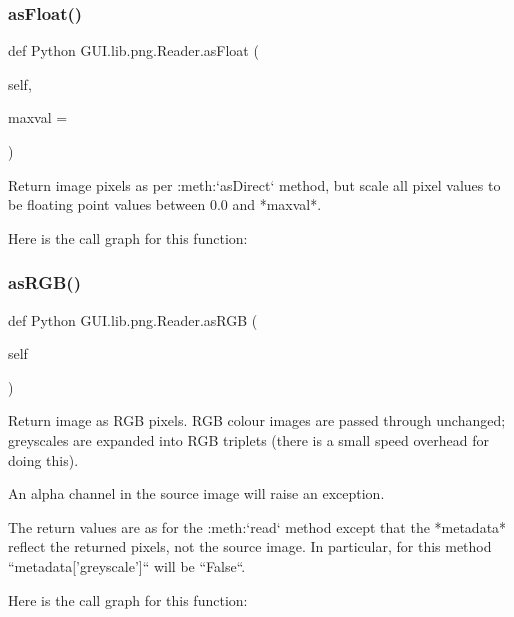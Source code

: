 \subsubsection{\texorpdfstring{as\+Float()}{asFloat()}}
{\footnotesize\ttfamily def Python G\+U\+I.\+lib.\+png.\+Reader.\+as\+Float (\begin{DoxyParamCaption}\item[{}]{self,  }\item[{}]{maxval = {} }\end{DoxyParamCaption})}

\begin{DoxyVerb}Return image pixels as per :meth:`asDirect` method, but scale
all pixel values to be floating point values between 0.0 and
*maxval*.
\end{DoxyVerb}
 Here is the call graph for this function\+:
\mbox{\label{class_python_01_g_u_i_1_1lib_1_1png_1_1_reader_a2323fcf6ed535c7cac5decdd1a6c3045}} 
\subsubsection{\texorpdfstring{as\+R\+G\+B()}{asRGB()}}
{\footnotesize\ttfamily def Python G\+U\+I.\+lib.\+png.\+Reader.\+as\+R\+GB (\begin{DoxyParamCaption}\item[{}]{self }\end{DoxyParamCaption})}

\begin{DoxyVerb}Return image as RGB pixels.  RGB colour images are passed
through unchanged; greyscales are expanded into RGB
triplets (there is a small speed overhead for doing this).

An alpha channel in the source image will raise an
exception.

The return values are as for the :meth:`read` method
except that the *metadata* reflect the returned pixels, not the
source image.  In particular, for this method
``metadata['greyscale']`` will be ``False``.
\end{DoxyVerb}
 Here is the call graph for this function\+:
\mbox{\label{class_python_01_g_u_i_1_1lib_1_1png_1_1_reader_ad89140dcc1c0170a52ad217db984410d}} 
